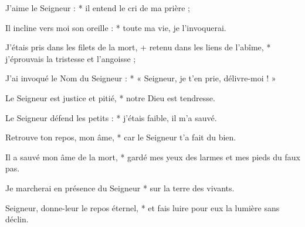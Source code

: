 \item J'aime le Seigneur : * il entend le cri de ma prière ;

\item Il incline vers moi son oreille : * toute ma vie, je l'invoquerai.

\item J'étais pris dans les filets de la mort, + retenu dans les liens de l'abîme, * j'éprouvais la tristesse et l'angoisse ;

\item J'ai invoqué le Nom du Seigneur : * « Seigneur, je t'en prie, délivre-moi ! »

\item Le Seigneur est justice et pitié, * notre Dieu est tendresse.

\item Le Seigneur défend les petits : * j'étais faible, il m'a sauvé.

\item Retrouve ton repos, mon âme, * car le Seigneur t'a fait du bien.

\item Il a sauvé mon âme de la mort, * gardé mes yeux des larmes et mes pieds du faux pas.

\item Je marcherai en présence du Seigneur * sur la terre des vivants.

\item Seigneur, donne-leur le repos éternel, * et fais luire pour eux la lumière sans déclin.